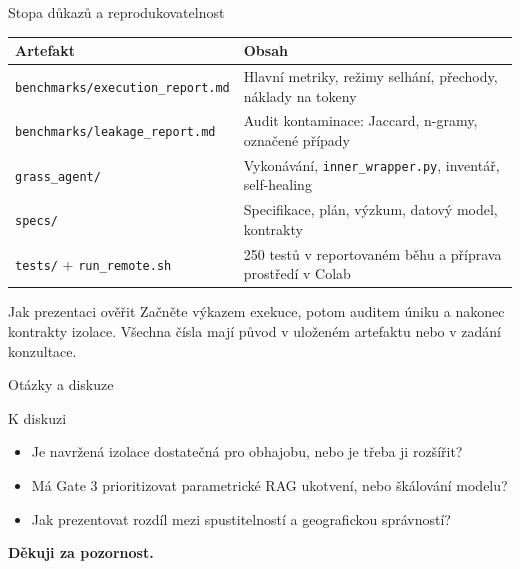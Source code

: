 \documentclass[aspectratio=169,11pt]{beamer}
\begin{document}
\begin{frame}[t]{Stopa důkazů a reprodukovatelnost}
  \small
  \begin{table}
    \centering
    \footnotesize
    \begin{tabular}{@{}p{5.0cm}p{8.0cm}@{}}
      \toprule
      \textbf{Artefakt} & \textbf{Obsah} \\
      \midrule
      \texttt{benchmarks/execution\_report.md}
        & Hlavní metriky, režimy selhání, přechody, náklady na tokeny \\
      \texttt{benchmarks/leakage\_report.md}
        & Audit kontaminace: Jaccard, n-gramy, označené případy \\
      \texttt{grass\_agent/}
        & Vykonávání, \texttt{inner\_wrapper.py}, inventář, self-healing \\
      \texttt{specs/}
        & Specifikace, plán, výzkum, datový model, kontrakty \\
      \texttt{tests/} + \texttt{run\_remote.sh}
        & 250 testů v reportovaném běhu a příprava prostředí v Colab \\
      \bottomrule
    \end{tabular}
  \end{table}

  \begin{block}{Jak prezentaci ověřit}
    Začněte výkazem exekuce, potom auditem úniku a nakonec kontrakty izolace.
    Všechna čísla mají původ v uloženém artefaktu nebo v zadání konzultace.
  \end{block}
\end{frame}

\begin{frame}[t]{Otázky a diskuze}
  \begin{block}{K diskuzi}
    \begin{itemize}
      \item Je navržená izolace dostatečná pro obhajobu, nebo je třeba ji
            rozšířit?
      \item Má Gate 3 prioritizovat parametrické RAG ukotvení, nebo škálování
            modelu?
      \item Jak prezentovat rozdíl mezi spustitelností a geografickou
            správností?
    \end{itemize}
  \end{block}

  \vspace{6mm}
  \begin{center}
    \Large\color{grassdark}\textbf{Děkuji za pozornost.}
  \end{center}
\end{frame}
\end{document}
